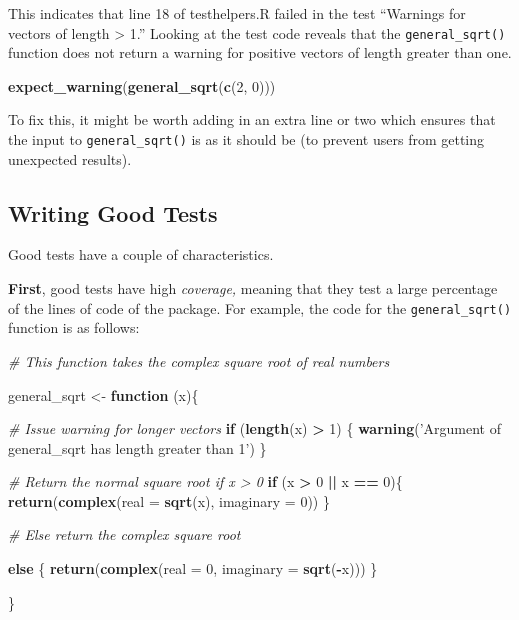 \documentclass[]{book}
\newenvironment{Shaded}{\begin{snugshade}}{\end{snugshade}}
\newcommand{\KeywordTok}[1]{\textcolor[rgb]{0.13,0.29,0.53}{\textbf{#1}}}
\newcommand{\DataTypeTok}[1]{\textcolor[rgb]{0.13,0.29,0.53}{#1}}
\newcommand{\DecValTok}[1]{\textcolor[rgb]{0.00,0.00,0.81}{#1}}
\newcommand{\StringTok}[1]{\textcolor[rgb]{0.31,0.60,0.02}{#1}}
\newcommand{\CommentTok}[1]{\textcolor[rgb]{0.56,0.35,0.01}{\textit{#1}}}
\newcommand{\ControlFlowTok}[1]{\textcolor[rgb]{0.13,0.29,0.53}{\textbf{#1}}}
\newcommand{\OperatorTok}[1]{\textcolor[rgb]{0.81,0.36,0.00}{\textbf{#1}}}
\newcommand{\NormalTok}[1]{#1}
\begin{document}
This indicates that line 18 of testhelpers.R failed in the test
``Warnings for vectors of length \textgreater{} 1.'' Looking at the test
code reveals that the \texttt{general\_sqrt()} function does not return
a warning for positive vectors of length greater than one.

\begin{Shaded}
\begin{Highlighting}[]
\KeywordTok{expect_warning}\NormalTok{(}\KeywordTok{general_sqrt}\NormalTok{(}\KeywordTok{c}\NormalTok{(}\DecValTok{2}\NormalTok{, }\DecValTok{0}\NormalTok{)))}
\end{Highlighting}
\end{Shaded}

To fix this, it might be worth adding in an extra line or two which
ensures that the input to \texttt{general\_sqrt()} is as it should be
(to prevent users from getting unexpected results).

\subsection{Writing Good Tests}\label{writing-good-tests}

Good tests have a couple of characteristics.

\textbf{First}, good tests have high \emph{coverage,} meaning that they
test a large percentage of the lines of code of the package. For
example, the code for the \texttt{general\_sqrt()} function is as
follows:

\begin{Shaded}
\begin{Highlighting}[]
\CommentTok{# This function takes the complex square root of real numbers}

\NormalTok{general_sqrt <-}\StringTok{ }\ControlFlowTok{function}\NormalTok{ (x)\{}

  \CommentTok{# Issue warning for longer vectors}
  \ControlFlowTok{if}\NormalTok{ (}\KeywordTok{length}\NormalTok{(x) }\OperatorTok{>}\StringTok{ }\DecValTok{1}\NormalTok{) \{}
    \KeywordTok{warning}\NormalTok{(}\StringTok{'Argument of general_sqrt has length greater than 1'}\NormalTok{)}
\NormalTok{  \}}

  \CommentTok{# Return the normal square root if x > 0}
  \ControlFlowTok{if}\NormalTok{ (x }\OperatorTok{>}\StringTok{ }\DecValTok{0} \OperatorTok{||}\StringTok{ }\NormalTok{x }\OperatorTok{==}\StringTok{ }\DecValTok{0}\NormalTok{)\{}
    \KeywordTok{return}\NormalTok{(}\KeywordTok{complex}\NormalTok{(}\DataTypeTok{real =} \KeywordTok{sqrt}\NormalTok{(x), }\DataTypeTok{imaginary =} \DecValTok{0}\NormalTok{))}
\NormalTok{  \}}

  \CommentTok{# Else return the complex square root}

  \ControlFlowTok{else}\NormalTok{ \{}
    \KeywordTok{return}\NormalTok{(}\KeywordTok{complex}\NormalTok{(}\DataTypeTok{real =} \DecValTok{0}\NormalTok{, }\DataTypeTok{imaginary =} \KeywordTok{sqrt}\NormalTok{(}\OperatorTok{-}\NormalTok{x)))}
\NormalTok{  \}}

\NormalTok{\}}
\end{Highlighting}
\end{Shaded}
\end{document}
